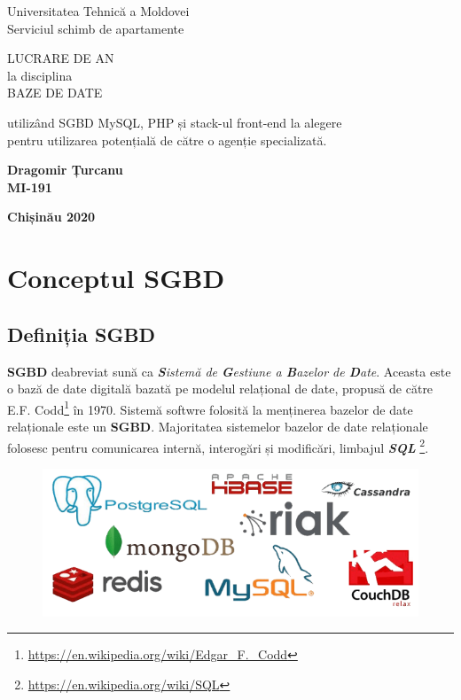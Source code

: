\documentclass[12pt. a4paper]{report}
\begin{document}
\begin{titlepage}
\newlength{\drop}

\textheight
\vspace*{\drop}
\centering
{\LARGE Universitatea Tehnică a Moldovei}\\[2\baselineskip]
{\LARGE\sffamily Serviciul schimb de apartamente}\par
\vfill
{\LARGE LUCRARE DE AN\\
\small la disciplina \\
\large BAZE DE DATE}\par
\vspace{\drop}
{\large utilizând SGBD MySQL, PHP și stack-ul front-end la alegere \\
pentru utilizarea potențială de către o agenție specializată.}\par
\vfill
{\large\bfseries Dragomir Țurcanu\\
\small MI-191}\par
\vspace*{\drop}
{\large\bfseries Chișinău 2020}\par

\end{titlepage}



\tableofcontents

\chapter{Conceptul SGBD}

\section{Definiția SGBD}
\textbf{SGBD} deabreviat sună ca \emph{\textbf{S}istemă de \textbf{G}estiune a \textbf{B}azelor de \textbf{D}ate}. Aceasta este o bază de date digitală bazată pe modelul relațional de date, propusă de către E.F. Codd\footnote{\url{https://en.wikipedia.org/wiki/Edgar_F._Codd}} în 1970. Sistemă softwre folosită la menținerea bazelor de date relaționale este un \textbf{SGBD}. Majoritatea sistemelor bazelor de date relaționale folosesc pentru comunicarea internă, interogări și modificări, limbajul \emph{\textbf{SQL}} \footnote{\url{https://en.wikipedia.org/wiki/SQL}}.

\begin{figure}[H]
\center
\includegraphics[width=\textwidth]{sgbd_logos}
\end{figure}
\end{document}
